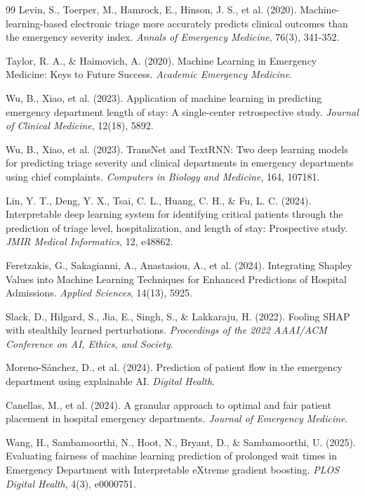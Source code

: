 \documentclass[harvard,article]{frontiersinFPHY_FAMS}
\begin{document}
\begin{thebibliography}{99}
 Levin, S., Toerper, M., Hamrock, E., Hinson, J. S., et al. (2020). Machine-learning-based electronic triage more accurately predicts clinical outcomes than the emergency severity index. \textit{Annals of Emergency Medicine}, 76(3), 341-352.

 Taylor, R. A., \& Haimovich, A. (2020). Machine Learning in Emergency Medicine: Keys to Future Success. \textit{Academic Emergency Medicine}.

 Wu, B., Xiao, et al. (2023). Application of machine learning in predicting emergency department length of stay: A single-center retrospective study. \textit{Journal of Clinical Medicine}, 12(18), 5892.

 Wu, B., Xiao, et al. (2023). TransNet and TextRNN: Two deep learning models for predicting triage severity and clinical departments in emergency departments using chief complaints. \textit{Computers in Biology and Medicine}, 164, 107181.

 Lin, Y. T., Deng, Y. X., Tsai, C. L., Huang, C. H., \& Fu, L. C. (2024). Interpretable deep learning system for identifying critical patients through the prediction of triage level, hospitalization, and length of stay: Prospective study. \textit{JMIR Medical Informatics}, 12, e48862.

 Feretzakis, G., Sakagianni, A., Anastasiou, A., et al. (2024). Integrating Shapley Values into Machine Learning Techniques for Enhanced Predictions of Hospital Admissions. \textit{Applied Sciences}, 14(13), 5925.

 Slack, D., Hilgard, S., Jia, E., Singh, S., \& Lakkaraju, H. (2022). Fooling SHAP with stealthily learned perturbations. \textit{Proceedings of the 2022 AAAI/ACM Conference on AI, Ethics, and Society}.

 Moreno-Sánchez, D., et al. (2024). Prediction of patient flow in the emergency department using explainable AI. \textit{Digital Health}.

 Canellas, M., et al. (2024). A granular approach to optimal and fair patient placement in hospital emergency departments. \textit{Journal of Emergency Medicine}.

 Wang, H., Sambamoorthi, N., Hoot, N., Bryant, D., \& Sambamoorthi, U. (2025). Evaluating fairness of machine learning prediction of prolonged wait times in Emergency Department with Interpretable eXtreme gradient boosting. \textit{PLOS Digital Health}, 4(3), e0000751.


\end{thebibliography}
\end{document}
